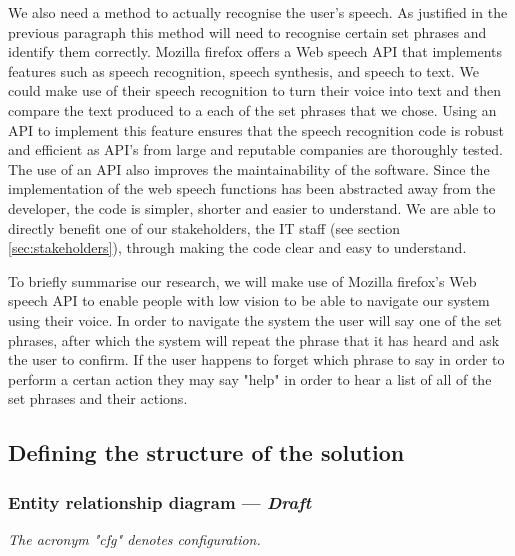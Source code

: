 We also need a method to actually recognise the user's speech.
As justified in the previous paragraph this method will need
to recognise certain set phrases and identify them correctly.
Mozilla firefox offers a Web speech API that implements 
features such as speech recognition, speech synthesis, and
speech to text. We could make use of their speech recognition
to turn their voice into text and then compare the text
produced to a each of the set phrases that we chose. Using an
API to implement this feature ensures that the speech recognition
code is robust and efficient as API's from large and reputable
companies are thoroughly tested. The use of an API also 
improves the maintainability of the software. Since the
implementation of the web speech functions has been abstracted 
away from the developer, the code is simpler, shorter and easier
to understand. We are able to directly benefit one of our
stakeholders, the IT staff (see section \ref{sec:stakeholders}),
through making the code clear and easy to understand.\\ \vspace{0.2cm}

To briefly summarise our research, we will make use of Mozilla
firefox's Web speech API to enable people with low vision to be 
able to navigate our system using their voice. In order to navigate
the system the user will say one of the set phrases, after which the 
system will repeat the phrase that it has heard and ask the user 
to confirm. If the user happens to forget which phrase to say in 
order to perform a certan action they may say "help" in order to 
hear a list of all of the set phrases and their actions.

\subsection{Defining the structure of the solution}

\subsubsection{Entity relationship diagram — \textit{Draft}}
\label{sec:erdd}


\textit{The acronym "cfg" denotes configuration.}

